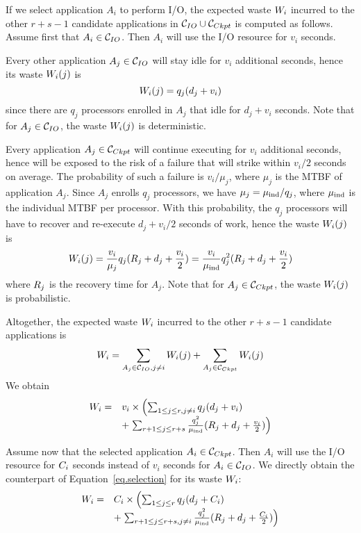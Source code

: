 If we select application $A_{i}$ to perform I/O, the expected waste $W_{i}$
incurred to the other $r+s-1$ candidate applications in  $\mathcal{C}_{IO} \cup
\mathcal{C}_{Ckpt}$ is computed as follows. Assume first that $A_{i} \in \mathcal{C}_{IO}$.
Then  $A_{i}$ will use the I/O resource for $v_{i}$ seconds.
\begin{compactitem}
%
  \item Every other application $A_{j} \in \mathcal{C}_{IO}$ will stay idle for $v_{i}$
  additional seconds, hence its waste $W_{i}(j)$ is $$W_{i}(j) = q_{j}
  (d_{j} + v_{i})$$ since there are $q_{j}$ processors enrolled in $A_{j}$ that
  idle for $d_{j} + v_{i}$ seconds. Note that for $A_{j} \in \mathcal{C}_{IO}$, the
  waste $W_{i}(j)$ is deterministic.
%
  \item Every application $A_{j} \in \mathcal{C}_{Ckpt}$ will continue executing for
  $v_{i}$ additional seconds, hence will be exposed to the risk of a failure
  that will strike within $v_{i}/2$ seconds on average. The probability of such
  a failure is $v_{i}/\mu_{j}$, where $\mu_{j}$ is the MTBF of application
  $A_{j}$. Since $A_{j}$ enrolls $q_{j}$ processors, we have $\mu_{j} =
  \mu_{\text{ind}}/q_{j}$, where $\mu_{\text{ind}}$ is the individual MTBF per processor. With this
  probability, the $q_{j}$ processors will have to recover and re-execute $d_{j} +
  v_{i}/2$ seconds of work, hence the waste $W_{i}(j)$ is $$W_{i}(j) =
  \frac{v_{i}}{\mu_{j} } q_{j} (R_{j} + d_{j} + \frac{v_{i}}{2}) =
  \frac{v_{i}}{\mu_{\text{ind}}} q^{2}_{j} (R_{j} + d_{j} + \frac{v_{i}}{2})$$ where
  $R_{j}$ is the recovery time for $A_{j}$. Note that for $A_{j} \in
  \mathcal{C}_{Ckpt}$, the waste $W_{i}(j)$ is probabilistic.
%
 \end{compactitem}
 Altogether, the expected waste $W_{i}$ incurred
to the other $r+s-1$ candidate applications is
$$W_{i} = \sum_{A_{j} \in \mathcal{C}_{IO}, j\neq i} W_{i}(j) + \sum_{A_{j} \in \mathcal{C}_{Ckpt}} W_{i}(j)$$
We obtain
\begin{equation}
\label{eq.selection}
\begin{array}{ll}
 W_{i} = & v_{i} \times \left( \sum_{1 \leq j \leq r, j\neq i} q_{j} (d_{j} + v_{i}) \right.\\
& + \left. \sum_{r+1 \leq j \leq r+s}   \frac{q^{2}_{j}}{\mu_{\text{ind}}} (R_{j} + d_{j} + \frac{v_{i}}{2}) \right)
 \end{array}
\end{equation}

 Assume now that the selected application $A_{i} \in \mathcal{C}_{Ckpt}$. Then  $A_{i}$ will use the I/O resource for $C_{i}$ seconds instead of $v_{i}$ seconds for $A_{i} \in \mathcal{C}_{IO}$. We directly obtain the counterpart of Equation~\eqref{eq.selection} for its waste $W_{i}$:
 \begin{equation}
\label{eq.selection2}
 \begin{array}{ll}
 W_{i} = & C_{i} \times \left( \sum_{1 \leq j \leq r} q_{j} (d_{j} + C_{i}) \right.\\
& + \left. \sum_{r+1 \leq j \leq r+s, j\neq i}   \frac{q^{2}_{j}}{\mu_{\text{ind}}} (R_{j} + d_{j} + \frac{C_{i}}{2}) \right)
 \end{array}
\end{equation}

